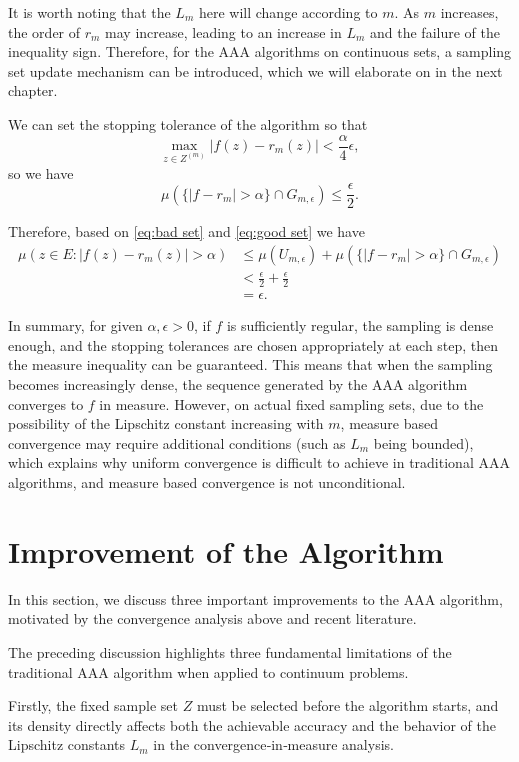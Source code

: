 \documentclass[12pt,a4paper]{article}  %
\theoremstyle{definition}
\numberwithin{equation}{section}
\begin{document}
It is worth noting that the $L_m$ here will change according to $m$. As $m$ increases, the order of $r_m$ may increase, leading to an increase in $L_m$ and the failure of the inequality sign. Therefore, for the AAA algorithms on continuous sets, a sampling set update mechanism can be introduced, which we will elaborate on in the next chapter.

We can set the stopping tolerance of the algorithm so that 
\[
\max\limits_{z\in Z^{(m)}}|f(z)-r_m(z)|<\frac{\alpha}{4}\epsilon,
\]
so we have
\begin{equation}
    \mu(\{|f-r_m|>\alpha\}\cap G_{m,\epsilon})\le\frac{\epsilon}{2}. \label{eq:good set}
\end{equation}

Therefore, based on \ref{eq:bad set} and \ref{eq:good set} we have
\begin{align*}
    \mu(z\in E:|f(z)-r_m(z)|>\alpha)&\le\mu(U_{m,\epsilon})+\mu(\{|f-r_m|>\alpha\}\cap G_{m,\epsilon})\\
    &<\frac{\epsilon}{2}+\frac{\epsilon}{2}\\
    &=\epsilon.
\end{align*}

In summary, for given $\alpha, \epsilon>0$, if $f$ is sufficiently regular, the sampling is dense enough, and the stopping tolerances are chosen appropriately at each step, then the measure inequality can be guaranteed. This means that when the sampling becomes increasingly dense, the sequence generated by the AAA algorithm converges to $f$ in measure. However, on actual fixed sampling sets, due to the possibility of the Lipschitz constant increasing with $m$, measure based convergence may require additional conditions (such as $L_m$ being bounded), which explains why uniform convergence is difficult to achieve in traditional AAA algorithms, and measure based convergence is not unconditional.


\section{Improvement of the Algorithm}
In this section, we discuss three important improvements to the AAA algorithm, motivated by the convergence analysis above and recent literature.

The preceding discussion highlights three fundamental limitations of the traditional AAA algorithm when applied to continuum problems.

Firstly, the fixed sample set $Z$ must be selected before the algorithm starts, and its density directly affects both the achievable accuracy and the behavior of the Lipschitz constants $L_m$ in the convergence‑in‑measure analysis. 
\end{document}
